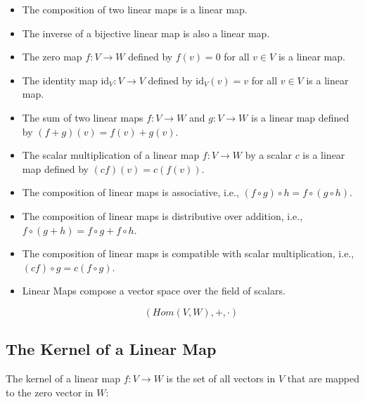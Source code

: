 \begin{itemize}
    
    \item The composition of two linear maps is a linear map.
    
    \item The inverse of a bijective linear map is also a linear map.
    
    \item The zero map \( f: V \to W \) defined by \( f(v) = 0 \) 
          for all \( v \in V \) is a linear map.
    
    \item The identity map \( \text{id}_V: V \to V \) defined by \( \text{id}_V(v) = v \) for all 
          \( v \in V \) is a linear map.
    
    \item The sum of two linear maps \( f: V \to W \) 
          and \( g: V \to W \) is a linear map defined by \( (f + g)(v) = f(v) + g(v) \).
    
    \item The scalar multiplication of a linear map \( f: V \to W \) by a scalar \( c \) is a linear 
          map defined by \( (cf)(v) = c(f(v)) \).
    
    \item The composition of linear maps is associative, i.e., \( (f \circ g) \circ h = f \circ (g \circ h) \).
    
    \item The composition of linear maps is distributive over addition, i.e., 
          \( f \circ (g + h) = f \circ g + f \circ h \).
    
    \item The composition of linear maps is compatible with scalar multiplication, i.e., 
          \( (cf) \circ g = c(f \circ g) \).
    
    \item Linear Maps compose a vector space 
          over the field of scalars.
          
          \[
            (Hom(V,W), +, \cdot )
          \]

\end{itemize}

\subsection{The Kernel of a Linear Map}

The kernel of a linear map \( f: V \to W \) is the set of all vectors in \( V \) that are mapped to 
the zero vector in \( W \):

